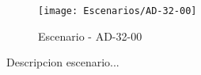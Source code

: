 \begin{figure}[H]
\centering
\texttt{[image: Escenarios/AD-32-00]}
\caption{Escenario - AD-32-00}
\label{fig:AD-32-00}
\end{figure}

Descripcion escenario...
\clearpage
